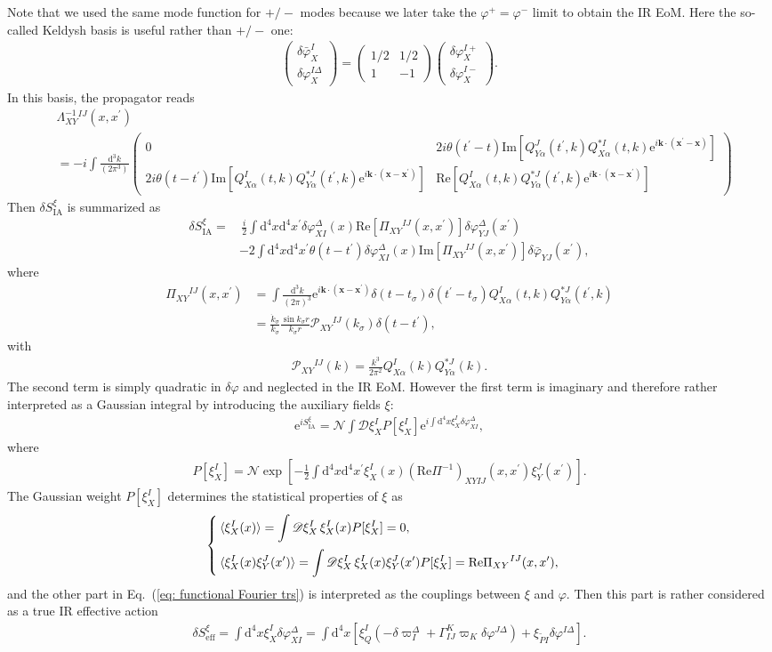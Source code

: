\documentclass[aps, prd
, preprint
, nofootinbib 
, notitlepage
, longbibliography
]{revtex4-1}
\newcommand{\dd}{\mathrm{d}}
\newcommand{\ee}{\mathrm{e}}
\renewcommand{\Re}{\mathrm{Re}}
\renewcommand{\Im}{\mathrm{Im}}
\newcommand{\dk}{\frac{\dd^3k}{(2\pi)^3}}
\newcommand{\dps}{\displaystyle}
\newcommand{\eff}{\text{eff}}
\newcommand{\IA}{\mathrm{IA}}
\newcommand{\scrD}{\mathscr{D}}
\newcommand{\calN}{\mathcal{N}}
\newcommand{\calP}{\mathcal{P}}
\newcommand{\bae}[1]{\begin{align} #1 \end{align}}
\newcommand{\bce}[1]{\begin{cases} #1 \end{cases}}
\newcommand{\bpme}[1]{\begin{pmatrix} #1 \end{pmatrix}}
\begin{document}
Note that we used the same mode function for $+/-$ modes because we later take the $\varphi^+=\varphi^-$ limit to obtain the IR EoM. 
Here the so-called Keldysh basis is useful rather than $+/-$ one:
\bae{
	\bpme{
		\delta\bar{\varphi}_X^I \\
		\delta\varphi_X^{I\Delta}
	} = \bpme{
		1/2 & 1/2 \\
		1 & -1
	}\bpme{
		\delta\varphi_X^{I+} \\
		\delta\varphi_X^{I-}
	}.
}
In this basis, the propagator reads
\bae{
    &\Lambda^{-1}_{XY}{}^{IJ}(x,x^\prime) \nonumber \\
    &=-i\int\frac{\dd^3k}{(2\pi^3)}\bpme{
        0 & 2i\theta(t^\prime-t)\Im[Q_{Y\alpha}^J(t^\prime,k)Q_{X\alpha}^{*I}(t,k)\ee^{i\mathbf{k}\cdot(\mathbf{x}^\prime-\mathbf{x})}] \\
        2i\theta(t-t^\prime)\Im[Q_{X\alpha}^I(t,k)Q_{Y\alpha}^{*J}(t^\prime,k)\ee^{i\mathbf{k}\cdot(\mathbf{x}-\mathbf{x}^\prime)}] & \Re[Q_{X\alpha}^I(t,k)Q_{Y\alpha}^{*J}(t^\prime,k)\ee^{i\mathbf{k}\cdot(\mathbf{x}-\mathbf{x}^\prime)}]
    }
}
Then $\delta S_\IA^\xi$ is summarized as
\bae{
	\delta S_\IA^\xi=&\,\frac{i}{2}\int\dd^4x\dd^4x^\prime\delta\varphi_{XI}^\Delta(x)\Re[\Pi_{XY}{}^{IJ}(x,x^\prime)]\delta\varphi_{YJ}^\Delta(x^\prime) \nonumber \\
	&-2\int\dd^4x\dd^4x^\prime\theta(t-t^\prime)\delta\varphi_{XI}^\Delta(x)\Im[\Pi_{XY}{}^{IJ}(x,x^\prime)]\delta\bar{\varphi}_{YJ}(x^\prime),
}
where
\bae{
	\Pi_{XY}{}^{IJ}(x,x^\prime)&=\int\dk\ee^{i\mathbf{k}\cdot(\mathbf{x}-\mathbf{x}^\prime)}\delta(t-t_\sigma)\delta(t^\prime-t_\sigma)
	Q_{X\alpha}^I(t,k)Q^{*J}_{Y\alpha}(t^\prime,k) \nonumber \\
	&=\frac{\dot{k}_\sigma}{k_\sigma}\frac{\sin k_\sigma r}{k_\sigma r}\calP_{XY}{}^{IJ}(k_\sigma)\delta(t-t^\prime),
}
with
\bae{\label{eq: calP}
	\calP_{XY}{}^{IJ}(k)=\frac{k^3}{2\pi^2}Q_{X\alpha}^I(k)Q_{Y\alpha}^{*J}(k).
}
The second term is simply quadratic in $\delta\varphi$ and neglected in the IR EoM. However the first term is imaginary and therefore rather interpreted as a Gaussian integral
by introducing the auxiliary fields $\xi$:
\bae{\label{eq: functional Fourier trs}
	\ee^{iS_\IA^\xi}=\calN\int\scrD\xi_X^IP[\xi_X^I]\ee^{i\int\dd^4x\xi_X^I\delta\varphi_{XI}^\Delta},
}
where
\bae{
	P[\xi_X^I]=\calN\exp\left[-\frac{1}{2}\int\dd^4x\dd^4x^\prime\xi_{X}^I(x)(\Re\Pi^{-1})_{XYIJ}(x,x^\prime)\xi_Y^J(x^\prime)\right].
}
The Gaussian weight $P[\xi_X^I]$ determines the statistical properties of $\xi$ as
\bae{
	\bce{
		\dps
		\braket{\xi_X^I(x)}=\int\scrD\xi_X^I\,\xi_X^I(x)P[\xi_X^I]=0, \\[10pt]
		\dps
		\braket{\xi_X^I(x)\xi_{Y}^J(x^\prime)}=\int\scrD\xi_X^I\,\xi_X^I(x)\xi_{Y}^J(x^\prime)P[\xi_X^I]=\Re\Pi_{XY}{}^{IJ}(x,x^\prime),
	}
}
and the other part in Eq.~(\ref{eq: functional Fourier trs}) is interpreted as the couplings between $\xi$ and $\varphi$.
Then this part is rather considered as a true IR effective action
\bae{
	\delta S_\eff^\xi=\int\dd^4x\xi_X^I\delta\varphi_{XI}^\Delta=\int\dd^4x\left[\xi_Q^I(-\delta\varpi_I^\Delta+\Gamma^K_{IJ}\varpi_K\delta\varphi^{J\Delta})
	+\xi_{\tilde{P}I}\delta\varphi^{I\Delta}\right].
}
\end{document}
